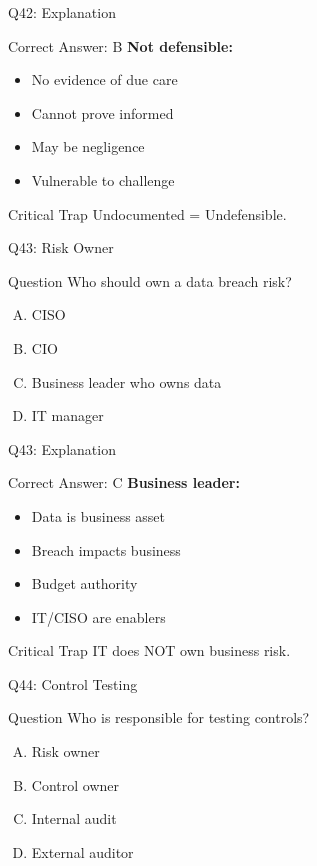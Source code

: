 \documentclass{beamer}
\begin{document}
			\begin{frame}{Q42: Explanation}
				\begin{block}{Correct Answer: B}
					\textbf{Not defensible:}
					\begin{itemize}
						\item No evidence of due care
						\item Cannot prove informed
						\item May be negligence
						\item Vulnerable to challenge
					\end{itemize}
				\end{block}
				\begin{alertblock}{Critical Trap}
					Undocumented = Undefensible.
				\end{alertblock}
			\end{frame}
			
			\begin{frame}{Q43: Risk Owner}
				\begin{block}{Question}
					Who should own a data breach risk?
				\end{block}
				\begin{enumerate}[(A)]
					\item CISO
					\item CIO
					\item Business leader who owns data
					\item IT manager
				\end{enumerate}
			\end{frame}
			
			\begin{frame}{Q43: Explanation}
				\begin{block}{Correct Answer: C}
					\textbf{Business leader:}
					\begin{itemize}
						\item Data is business asset
						\item Breach impacts business
						\item Budget authority
						\item IT/CISO are enablers
					\end{itemize}
				\end{block}
				\begin{alertblock}{Critical Trap}
					IT does NOT own business risk.
				\end{alertblock}
			\end{frame}
			
			\begin{frame}{Q44: Control Testing}
				\begin{block}{Question}
					Who is responsible for testing controls?
				\end{block}
				\begin{enumerate}[(A)]
					\item Risk owner
					\item Control owner
					\item Internal audit
					\item External auditor
				\end{enumerate}
			\end{frame}
			
\end{document}

